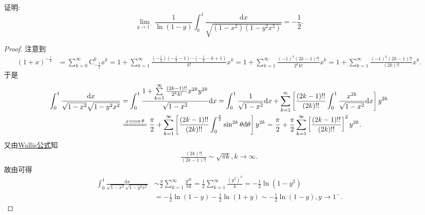 \documentclass[../../main.tex]{subfiles}%
\begin{document}
\begin{example}
证明:
\[
\lim_{y\rightarrow 1^{-}}\frac{1}{\ln(1 - y)}\int_{0}^{1}\frac{\mathrm{d}x}{\sqrt{(1 - x^2)(1 - y^2x^2)}}=-\frac{1}{2}.
\]
\end{example}
\begin{proof}

注意到
\begin{align*}
(1+x)^{-\frac{1}{2}}&=\sum_{k=0}^{\infty}\mathrm{C}_{-\frac{1}{2}}^{k}x^k=1+\sum_{k=1}^{\infty}\frac{\left( -\frac{1}{2} \right) \left( -\frac{1}{2}-1 \right) \cdots \left( -\frac{1}{2}-k+1 \right)}{k!}x^k=1+\sum_{k=1}^{\infty}\frac{(-1)^k(2k-1)!!}{2^kk!}x^k=1+\sum_{k=1}^{\infty}\frac{(-1)^k(2k-1)!!}{(2k)!!}x^k.
\end{align*}
于是
\begin{align*}
\int_0^1\frac{\mathrm{d}x}{\sqrt{1-x^2}\sqrt{1-y^2x^2}}&=\int_0^1\frac{1+\sum\limits_{k=1}^{\infty}\frac{(2k-1)!!}{2^kk!}x^{2k}y^{2k}}{\sqrt{1-x^2}}\mathrm{d}x=\int_0^1\frac{1}{\sqrt{1-x^2}}\mathrm{d}x+\sum_{k=1}^{\infty}\left[ \frac{(2k-1)!!}{(2k)!!}\int_0^1\frac{x^{2k}}{\sqrt{1-x^2}}\mathrm{d}x \right]y^{2k}\\
&\xlongequal{x=\cos \theta}\frac{\pi}{2}+\sum_{k=1}^{\infty}\left[ \frac{(2k-1)!!}{(2k)!!}\int_0^{\frac{\pi}{2}}\sin ^{2k}\theta \mathrm{d}\theta \right]y^{2k}=\frac{\pi}{2}+\frac{\pi}{2}\sum_{k=1}^{\infty}\left[ \frac{(2k-1)!!}{(2k)!!} \right]^2y^{2k}.
\end{align*}
又由\hyperref[theorem:Wallis公式]{Wallis公式}知
\begin{align*}
\frac{(2k)!!}{(2k-1)!!}\sim \sqrt{\pi k},k\rightarrow \infty .
\end{align*}
故由可得
\begin{align*}
\int_0^1\frac{\mathrm{d}x}{\sqrt{1-x^2}\sqrt{1-y^2x^2}}&\sim \frac{\pi}{2}\sum_{k=1}^{\infty}\frac{y^{2k}}{\pi k}=\frac{1}{2}\sum_{k=1}^{\infty}\frac{(y^2)^k}{k}=-\frac{1}{2}\ln(1-y^2)\\
&=-\frac{1}{2}\ln(1-y)-\frac{1}{2}\ln(1+y)\sim -\frac{1}{2}\ln(1-y),y\rightarrow 1^-.
\end{align*}

\end{proof}
\end{document}
